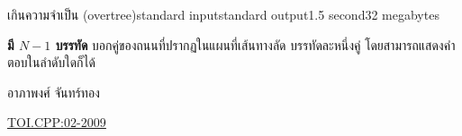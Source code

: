 \documentclass[11pt,a4paper]{article}
\begin{document}
\begin{problem}{เกินความจำเป็น (overtree)}{standard input}{standard output}{1.5 second}{32 megabytes}
\OutputFile

\textbf{มี $N-1$ บรรทัด} บอกคู่ของถนนที่ปรากฏในแผนที่เส้นทางลัด บรรทัดละหนึ่งคู่ โดยสามารถแสดงคำตอบในลำดับใดก็ได้

\Examples

\begin{example}
%
%
\end{example}


\Source

อาภาพงศ์ จันทร์ทอง

\underline{\href{http://www.thailandoi.org/toi.c/02-2009}{TOI.CPP:02-2009}}

\end{problem}
\end{document}
